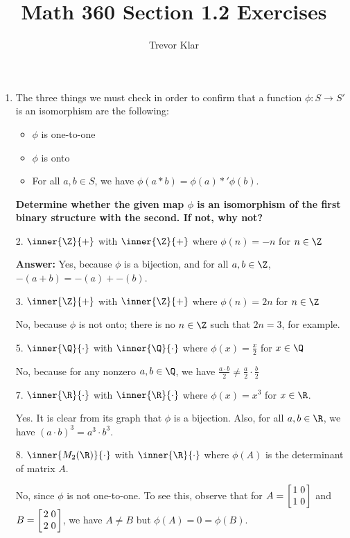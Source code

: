 \documentclass[letterpaper]{article}
\title{Math 360 \linebreak
Section 1.2 Exercises}
\author{Trevor Klar}
\begin{document}
\maketitle

\begin{enumerate}
\item The three things we must check in order to confirm that a function $\phi:{S}\to{S'}$ is an isomorphism are the following:
	\begin{itemize}
	\item $\phi$ is one-to-one
	\item $\phi$ is onto
	\item For all $a,b\in S$, we have $\phi(a*b)=\phi(a)*'\phi(b)$. 
	\end{itemize}

\hspace*{-0.74cm}\textbf{Determine whether the given map $\phi$ is an isomorphism of the first binary structure with the second. If not, why not?}

\item[2.] $\inner{\Z}{+}$ with $\inner{\Z}{+}$ where $\phi(n)=-n$ for $n\in\Z$

\textbf{Answer: }Yes, because $\phi$ is a bijection, and for all $a,b\in\Z$, $-(a+b)=-(a)+-(b)$. 

\item[3.] $\inner{\Z}{+}$ with $\inner{\Z}{+}$ where $\phi(n)=2n$ for $n\in\Z$

\answer No, because $\phi$ is not onto; there is no $n\in\Z$ such that $2n=3$, for example. 

\item[5.] $\inner{\Q}{\cdot}$ with $\inner{\Q}{\cdot}$ where $\phi(x)=\frac{x}{2}$ for $x\in\Q$

\answer No, because for any nonzero $a,b\in\Q$, we have $\frac{a\cdot b}{2}\neq\frac{a}{2}\cdot\frac{b}{2}$

\item[7.] $\inner{\R}{\cdot}$ with $\inner{\R}{\cdot}$ where $\phi(x)=x^3$ for $x\in\R$. 

\answer Yes. It is clear from its graph that $\phi$ is a bijection. Also, for all $a,b\in\R$, we have $(a\cdot b)^3=a^3\cdot b^3$. 

\item[8.] $\inner{M_2(\R)}{\cdot}$ with $\inner{\R}{\cdot}$ where $\phi(A)$ is the determinant of matrix $A$. 

\answer No, since $\phi$ is not one-to-one. To see this, observe that for 
$A = 
\arraycolsep=1.4pt\def\arraystretch{1}
\left[\begin{array}{lr}
1 & 0 \\
1 & 0 \\
\end{array} \right]$ and 
$B = 
\arraycolsep=1.4pt\def\arraystretch{1}
\left[\begin{array}{lr}
2 & 0 \\
2 & 0 \\
\end{array} \right]$, we have $A\neq B$ but $\phi(A)=0=\phi(B)$.


\end{enumerate}
\end{document}
